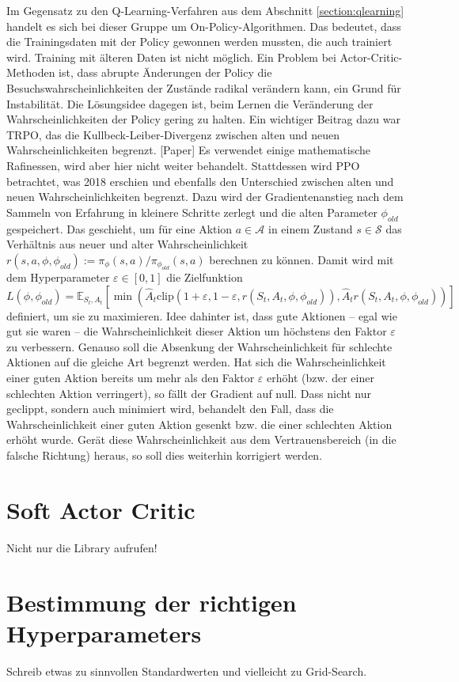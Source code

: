 Im Gegensatz zu den Q-Learning-Verfahren aus dem Abschnitt \ref{section:qlearning} handelt es sich bei dieser Gruppe um On-Policy-Algorithmen.
Das bedeutet, dass die Trainingsdaten mit der Policy gewonnen werden mussten, die auch trainiert wird.
Training mit älteren Daten ist nicht möglich.
Ein Problem bei Actor-Critic-Methoden ist, dass abrupte Änderungen der Policy die Besuchswahrscheinlichkeiten der Zustände radikal verändern kann, ein Grund für Instabilität.
Die Lösungsidee dagegen ist, beim Lernen die Veränderung der Wahrscheinlichkeiten der Policy gering zu halten.
Ein wichtiger Beitrag dazu war TRPO, das die Kullbeck-Leiber-Divergenz zwischen alten und neuen Wahrscheinlichkeiten begrenzt. [Paper]
Es verwendet einige mathematische Rafinessen, wird aber hier nicht weiter behandelt.
Stattdessen wird PPO betrachtet, was 2018 erschien und ebenfalls den Unterschied zwischen alten und neuen Wahrscheinlichkeiten begrenzt.
Dazu wird der Gradientenanstieg nach dem Sammeln von Erfahrung in kleinere Schritte zerlegt und die alten Parameter $\phi_{old}$ gespeichert.
Das geschieht, um für eine Aktion $a \in \mathcal{A}$ in einem Zustand $s \in \mathcal{S}$ das Verhältnis aus neuer und alter Wahrscheinlichkeit $r(s, a, \phi, \phi_{old}) := \pi_\phi(s, a) / \pi_{\phi_{old}}(s, a)$ berechnen zu können.
Damit wird mit dem Hyperparameter $\varepsilon \in [0,1]$ die Zielfunktion
\begin{equation}
    L(\phi, \phi_{old}) = \mathbb{E}_{S_t, A_t}\left[\min{\left(\hat{A}_t \text{clip}{\left(1 + \varepsilon, 1 - \varepsilon, r(S_t, A_t, \phi, \phi_{old})\right)}, \hat{A}_t r(S_t, A_t, \phi, \phi_{old})\right)}\right]
\end{equation}
definiert, um sie zu maximieren.
Idee dahinter ist, dass gute Aktionen -- egal wie gut sie waren -- die Wahrscheinlichkeit dieser Aktion um höchstens den Faktor $\varepsilon$ zu verbessern.
Genauso soll die Absenkung der Wahrscheinlichkeit für schlechte Aktionen auf die gleiche Art begrenzt werden.
Hat sich die Wahrscheinlichkeit einer guten Aktion bereits um mehr als den Faktor $\varepsilon$ erhöht (bzw. der einer schlechten Aktion verringert), so fällt der Gradient auf null.
Dass nicht nur geclippt, sondern auch minimiert wird, behandelt den Fall, dass die Wahrscheinlichkeit einer guten Aktion gesenkt bzw. die einer schlechten Aktion erhöht wurde.
Gerät diese Wahrscheinlichkeit aus dem Vertrauensbereich (in die falsche Richtung) heraus, so soll dies weiterhin korrigiert werden.

\section{Soft Actor Critic}
Nicht nur die Library aufrufen!

\section{Bestimmung der richtigen Hyperparameters}
Schreib etwas zu sinnvollen Standardwerten und vielleicht zu Grid-Search.
